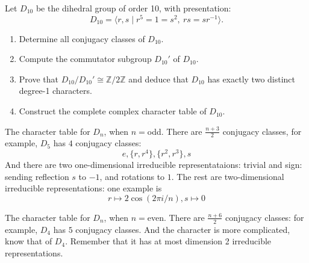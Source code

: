 \begin{prob}[F2000-Q7]
    Let \( D_{10} \) be the dihedral group of order 10, with presentation:
    \[
    D_{10} = \langle r, s \mid r^5 = 1 = s^2,\ rs = sr^{-1} \rangle.
    \]
    
    \begin{enumerate}
        \item Determine all conjugacy classes of \( D_{10} \).
        
        \item Compute the commutator subgroup \( D_{10}' \) of \( D_{10} \).
        
        \item Prove that \( D_{10}/D_{10}' \cong \mathbb{Z}/2\mathbb{Z} \) and deduce that \( D_{10} \) has exactly two distinct degree-1 characters.
        
        \item Construct the complete complex character table of \( D_{10} \).
    \end{enumerate}
\end{prob}



\begin{prop}
    The character table for $D_n$, when $n=$odd. There are $\frac{n+3}{2}$ conjugacy classes, for example, $D_5$ has $4$ conjugacy classes:
    \begin{equation*}
        e, \{r,r^4\}, \{r^2,r^3\}, s
    \end{equation*}
    And there are two one-dimensional irreducible representataions: trivial and sign: sending reflection $s$ to $-1$, and rotations to $1$. The rest are two-dimensional irreducible representations: one example is 
    \begin{equation*}
        r\mapsto 2\cos(2\pi i/n), s\mapsto 0
    \end{equation*}
\end{prop}
The character table for $D_n$, when $n=$even. There are $\frac{n+6}{2}$ conjugacy classes: for example, $D_4$ has $5$ conjugacy classes. And the character is more complicated, know that of $D_4$. Remember that it has at most dimension 2 irreducible representations.
















